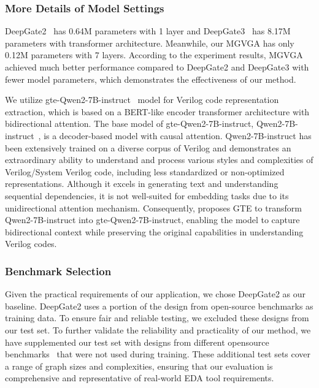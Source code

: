 \subsubsection{More Details of Model Settings}
\label{sec:model_set}

 DeepGate2~\citep{shi2023deepgate2} has 0.64M parameters with 1 layer and DeepGate3~\citep{shi2024deepgate3} has 8.17M parameters with transformer architecture.
Meanwhile, our MGVGA has only 0.12M parameters with 7 layers. 
According to the experiment results, MGVGA achieved much better performance compared to DeepGate2 and DeepGate3 with fewer model parameters, which demonstrates the effectiveness of our method. 

 We utilize gte-Qwen2-7B-instruct~\citep{li2023gte} model for Verilog code representation extraction, which is based on a BERT-like encoder transformer architecture with bidirectional attention. 
The base model of gte-Qwen2-7B-instruct, Qwen2-7B-instruct~\citep{yang2024qwen2}, is a decoder-based model with causal attention. 
Qwen2-7B-instruct has been extensively trained on a diverse corpus of Verilog and demonstrates an extraordinary ability to understand and process various styles and complexities of Verilog/System Verilog code, including less standardized or non-optimized representations. 
Although it excels in generating text and understanding sequential dependencies, it is not well-suited for embedding tasks due to its unidirectional attention mechanism. 
Consequently, \cite{li2023gte} proposes GTE to transform Qwen2-7B-instruct into gte-Qwen2-7B-instruct, enabling the model to capture bidirectional context while preserving the original capabilities in understanding Verilog codes.

\subsubsection{Benchmark Selection}
\label{sec:benchmark}	

Given the practical requirements of our application, we chose DeepGate2 as our baseline. 
DeepGate2 uses a portion of the design from open-source benchmarks as training data.
To ensure fair and reliable testing, we excluded these designs from our test set. 
To further validate the reliability and practicality of our method, we have supplemented our test set with designs from different opensource benchmarks~\citep{chowdhury2021openabcd,EPFLBenchmarks2015,openrisc2009or1200,yosys2019picorv32,asanovic2016rocket} that were not used during training. 
These additional test sets cover a range of graph sizes and complexities, ensuring that our evaluation is comprehensive and representative of real-world EDA tool requirements.

